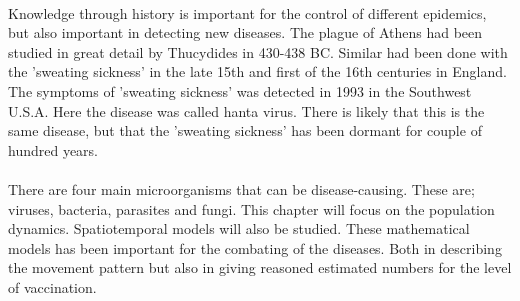 \documentclass[%
twoside,                 %
final,                   %
10pt]{article}
\begin{document}
\\
Knowledge through history is important for the control of different epidemics, but also important in detecting new diseases. The plague of Athens had been studied in great detail by Thucydides in 430-438 BC. Similar had been done with the 'sweating sickness' in the late 15th and first of the 16th centuries in England. The symptoms of 'sweating sickness' was detected in 1993 in the Southwest U.S.A. Here the disease was called hanta virus. There is likely that this is the same disease, but that the 'sweating sickness' has been dormant for couple of hundred years.
\\
\\
There are four main microorganisms that can be disease-causing. These are; viruses, bacteria, parasites and fungi. This chapter will focus on the population dynamics. Spatiotemporal models will also be studied. These mathematical models has been important for the combating of the diseases. Both in describing the movement pattern but also in giving reasoned estimated numbers for the level of vaccination.
\end{document}
